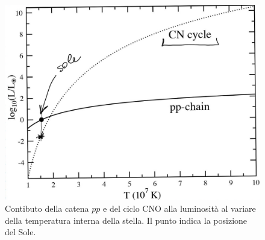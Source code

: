 \begin{figure}[!h]
	\centering
	\includegraphics[scale=0.5]{Immagini/0422_CNO-pp.png}
	\caption{Contibuto della catena $pp$ e del ciclo CNO alla luminosità al variare della temperatura interna della stella. Il punto indica la posizione del Sole.}
	\label{0422_sunCNO}
\end{figure}

